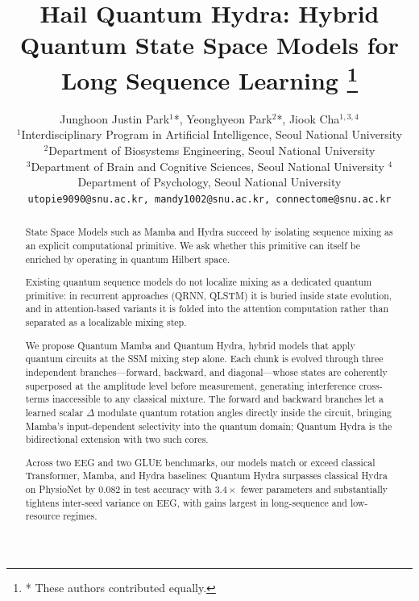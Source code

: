 \documentclass[conference]{IEEEtran}
\begin{document}
\title{Hail Quantum Hydra: Hybrid Quantum State Space Models for Long Sequence Learning \thanks{* These authors contributed equally.}}



\author{Junghoon Justin Park$^1$*, Yeonghyeon Park$^2$*, Jiook Cha$^{1,3,4}$\\
\small $^1$Interdisciplinary Program in Artificial Intelligence, Seoul National University \\ $^2$Department of Biosystems Engineering, Seoul National University \\ $^3$Department of Brain and Cognitive Sciences, Seoul National University $^4$Department of Psychology, Seoul National University \\
\small \texttt{utopie9090@snu.ac.kr, mandy1002@snu.ac.kr, connectome@snu.ac.kr}
}






\maketitle

\begin{abstract}

State Space Models such as Mamba and Hydra succeed by isolating sequence mixing as an explicit computational primitive. We ask whether this primitive can itself be enriched by operating in quantum Hilbert space.

Existing quantum sequence models do not localize mixing as a dedicated quantum primitive: in recurrent approaches (QRNN, QLSTM) it is buried inside state evolution, and in attention-based variants it is folded into the attention computation rather than separated as a localizable mixing step.

We propose Quantum Mamba and Quantum Hydra, hybrid models that apply quantum circuits at the SSM mixing step alone. Each chunk is evolved through three independent branches---forward, backward, and diagonal---whose states are coherently superposed at the amplitude level before measurement, generating interference cross-terms inaccessible to any classical mixture. The forward and backward branches let a learned scalar $\Delta$ modulate quantum rotation angles directly inside the circuit, bringing Mamba's input-dependent selectivity into the quantum domain; Quantum Hydra is the bidirectional extension with two such cores.

Across two EEG and two GLUE benchmarks, our models match or exceed classical Transformer, Mamba, and Hydra baselines: Quantum Hydra surpasses classical Hydra on PhysioNet by $0.082$ in test accuracy with $3.4\times$ fewer parameters and substantially tightens inter-seed variance on EEG, with gains largest in long-sequence and low-resource regimes.

\end{abstract}
\end{document}
